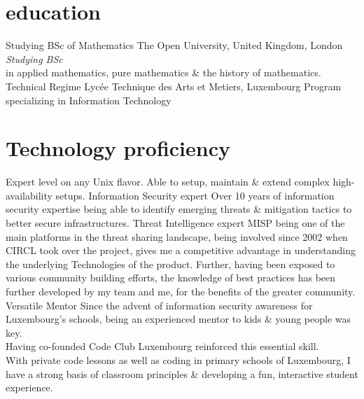\documentclass[a4paper]{friggeri-cv} %
\begin{document}
\section{education}
\begin{entrylist}
{Studying BSc {\normalfont of Mathematics}}
{The Open University, United Kingdom, London}
{\emph{Studying BSc} \\ in applied mathematics, pure mathematics \& the history of mathematics.}
{Technical Regime}
{Lyc\'{e}e Technique des Arts et Metiers, Luxembourg}
{Program specializing in Information Technology}
\end{entrylist}


\section{Technology proficiency}

\begin{entrylist}
{}
{Expert level on any Unix flavor. Able to setup, maintain \& extend complex high-availability setups.}
{Information Security expert}
{}
{Over 10 years of information security expertise being able to identify emerging threats \& mitigation tactics to better secure infrastructures.}
{Threat Intelligence expert}
{}
{MISP being one of the main platforms in the threat sharing landscape, being involved since 2002 when CIRCL took over the project, gives me a competitive advantage in understanding the underlying Technologies of the product. Further, having been exposed to various community building efforts, the knowledge of best practices has been further developed by my team and me, for the benefits of the greater community.}
{Versatile Mentor}
{}
{Since the advent of information security awareness for Luxembourg's schools, being an experienced mentor to kids \& young people was key. \\
Having co-founded Code Club Luxembourg reinforced this essential skill. \\
With private code lessons as well as coding in primary schools of Luxembourg, I have a strong basis of classroom principles \& developing a fun, interactive student experience.}
\end{entrylist}
\end{document}
